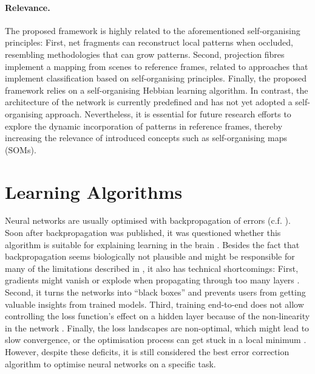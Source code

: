 \paragraph{Relevance.} The proposed framework is highly related to the aforementioned self-organising principles: First, net fragments can reconstruct local patterns when occluded, resembling methodologies that can grow patterns. Second, projection fibres implement a mapping from scenes to reference frames, related to approaches that implement classification based on self-organising principles. Finally, the proposed framework relies on a self-organising Hebbian learning algorithm.
In contrast, the architecture of the network is currently predefined and has not yet adopted a self-organising approach. Nevertheless, it is essential for future research efforts to explore the dynamic incorporation of patterns in reference frames, thereby increasing the relevance of introduced concepts such as self-organising maps (SOMs).



\section{Learning Algorithms}
Neural networks are usually optimised with backpropagation of errors (c.f. ).
Soon after backpropagation was published, it was questioned whether this algorithm is suitable for explaining learning in the brain .
Besides the fact that backpropagation seems biologically not plausible and might be responsible for many of the limitations described in , it also has technical shortcomings:
First, gradients might vanish or explode when propagating through too many layers .
Second, it turns the networks into ``black boxes'' and prevents users from getting valuable insights from trained models.
Third, training end-to-end does not allow controlling the loss function's effect on a hidden layer because of the non-linearity in the network .
Finally, the loss landscapes are non-optimal, which might lead to slow convergence, or the optimisation process can get stuck in a local minimum  .
However, despite these deficits, it is still considered the best error correction algorithm to optimise neural networks on a specific task. 

